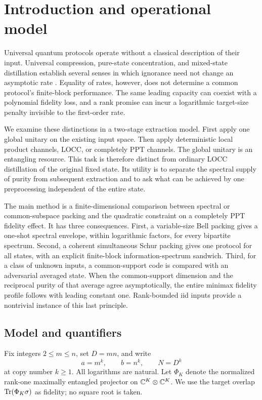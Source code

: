\section{Introduction and operational model}

Universal quantum protocols operate without a classical description of their input. Universal compression, pure-state concentration, and mixed-state distillation establish several senses in which ignorance need not change an asymptotic rate \cite{jhhh,hm,takagi,tirone,llf,rizzo}. Equality of rates, however, does not determine a common protocol's finite-block performance. The same leading capacity can coexist with a polynomial fidelity loss, and a rank promise can incur a logarithmic target-size penalty invisible to the first-order rate.

We examine these distinctions in a two-stage extraction model. First apply one global unitary on the existing input space. Then apply deterministic local product channels, LOCC, or completely PPT channels. The global unitary is an entangling resource. This task is therefore distinct from ordinary LOCC distillation of the original fixed state. Its utility is to separate the spectral supply of purity from subsequent extraction and to ask what can be achieved by one preprocessing independent of the entire state.

The main method is a finite-dimensional comparison between spectral or common-subspace packing and the quadratic constraint on a completely PPT fidelity effect. It has three consequences. First, a variable-size Bell packing gives a one-shot spectral envelope, within logarithmic factors, for every bipartite spectrum. Second, a coherent simultaneous Schur packing gives one protocol for all states, with an explicit finite-block information-spectrum sandwich. Third, for a class of unknown inputs, a common-support code is compared with an adversarial averaged state. When the common-support dimension and the reciprocal purity of that average agree asymptotically, the entire minimax fidelity profile follows with leading constant one. Rank-bounded iid inputs provide a nontrivial instance of this last principle.

\subsection{Model and quantifiers}
Fix integers $2\le m\le n$, set $D=mn$, and write
\[
 a=m^k,\qquad b=n^k,\qquad N=D^k
\]
at copy number $k\ge1$. All logarithms are natural. Let $\Phi_K$ denote the normalized rank-one maximally entangled projector on $\mathbb C^K\otimes\mathbb C^K$. We use the target overlap $\operatorname{Tr}(\Phi_K\sigma)$ as fidelity; no square root is taken.


